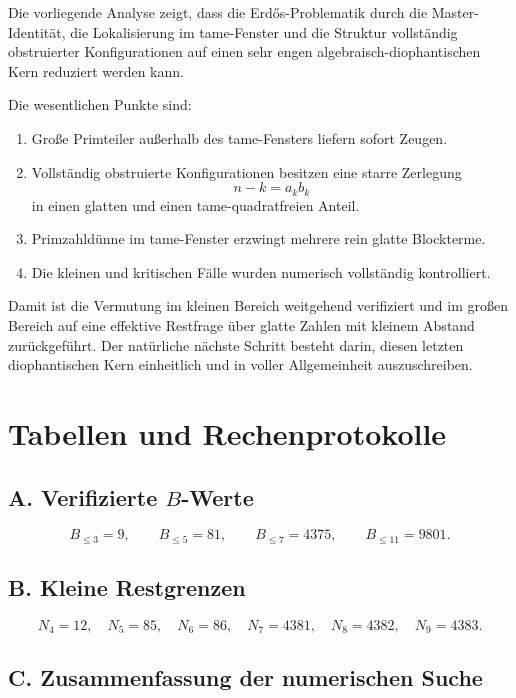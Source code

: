 \documentclass[12pt,a4paper]{article}
\theoremstyle{plain}
\theoremstyle{definition}
\theoremstyle{remark}
\begin{document}
	Die vorliegende Analyse zeigt, dass die Erdős-Problematik durch die Master-Identität, die Lokalisierung im tame-Fenster und die Struktur vollständig obstruierter Konfigurationen auf einen sehr engen algebraisch-diophantischen Kern reduziert werden kann.
	
	Die wesentlichen Punkte sind:
	
	\begin{enumerate}[label=\arabic*.]
		\item Große Primteiler außerhalb des tame-Fensters liefern sofort Zeugen.
		\item Vollständig obstruierte Konfigurationen besitzen eine starre Zerlegung
		\[
		n-k=a_k b_k
		\]
		in einen glatten und einen tame-quadratfreien Anteil.
		\item Primzahldünne im tame-Fenster erzwingt mehrere rein glatte Blockterme.
		\item Die kleinen und kritischen Fälle wurden numerisch vollständig kontrolliert.
	\end{enumerate}
	
	Damit ist die Vermutung im kleinen Bereich weitgehend verifiziert und im großen Bereich auf eine effektive Restfrage über glatte Zahlen mit kleinem Abstand zurückgeführt. 
	Der natürliche nächste Schritt besteht darin, diesen letzten diophantischen Kern einheitlich und in voller Allgemeinheit auszuschreiben.
	
	\appendix
	
	\section{Tabellen und Rechenprotokolle}
	
	\subsection*{A. Verifizierte $B$-Werte}
	
	\[
	B_{\le 3}=9,\qquad
	B_{\le 5}=81,\qquad
	B_{\le 7}=4375,\qquad
	B_{\le 11}=9801.
	\]
	
	\subsection*{B. Kleine Restgrenzen}
	
	\[
	N_4=12,\quad
	N_5=85,\quad
	N_6=86,\quad
	N_7=4381,\quad
	N_8=4382,\quad
	N_9=4383.
	\]
	
	\subsection*{C. Zusammenfassung der numerischen Suche}
	
\end{document}
